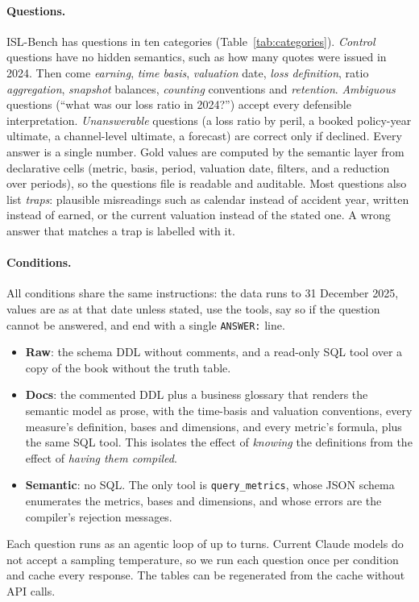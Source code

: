 \documentclass[11pt]{article}
\begin{document}
\paragraph{Questions.}
ISL-Bench has \BenchQuestions{} questions in ten categories (Table~\ref{tab:categories}). \emph{Control}
questions have no hidden semantics, such as how many quotes were issued in 2024. Then come \emph{earning},
\emph{time basis}, \emph{valuation} date, \emph{loss definition}, ratio \emph{aggregation}, \emph{snapshot}
balances, \emph{counting} conventions and \emph{retention}. \emph{Ambiguous} questions (``what was our loss ratio
in 2024?'') accept every defensible interpretation. \emph{Unanswerable} questions (a loss ratio by peril, a
booked policy-year ultimate, a channel-level ultimate, a forecast) are correct only if declined. Every answer is
a single number. Gold values are computed by the semantic layer from declarative cells (metric, basis, period,
valuation date, filters, and a reduction over periods), so the questions file is readable and auditable. Most
questions also list \emph{traps}: plausible misreadings such as calendar instead of accident year, written
instead of earned, or the current valuation instead of the stated one. A wrong answer that matches a trap is
labelled with it.

\paragraph{Conditions.}
All conditions share the same instructions: the data runs to 31 December 2025, values are as at that date unless
stated, use the tools, say so if the question cannot be answered, and end with a single \texttt{ANSWER:} line.
\begin{itemize}
\item \textbf{Raw}: the schema DDL without comments, and a read-only SQL tool over a copy of the book without the
truth table.
\item \textbf{Docs}: the commented DDL plus a business glossary that renders the semantic model as prose, with
the time-basis and valuation conventions, every measure's definition, bases and dimensions, and every metric's
formula, plus the same SQL tool. This isolates the effect of \emph{knowing} the definitions from the effect of
\emph{having them compiled}.
\item \textbf{Semantic}: no SQL. The only tool is \texttt{query\_metrics}, whose JSON schema enumerates the
metrics, bases and dimensions, and whose errors are the compiler's rejection messages.
\end{itemize}
Each question runs as an agentic loop of up to \MaxTurns{} turns. Current Claude models do not accept a
sampling temperature, so we run each question once per condition and cache every response. The tables can be
regenerated from the cache without API calls.
\end{document}
